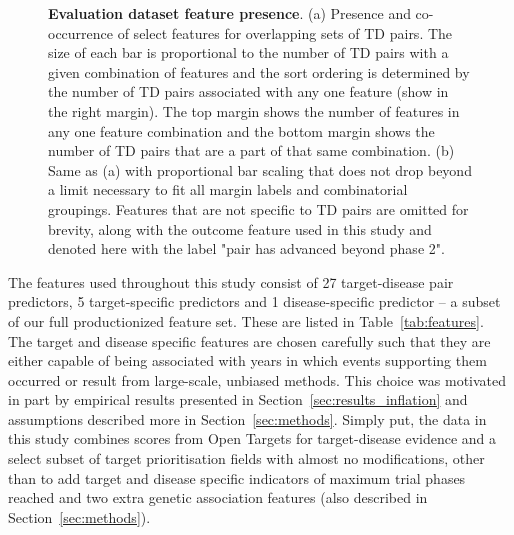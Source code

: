 \documentclass{article}
\begin{document}
\begin{figure}[!htb]
  \centering
  \captionsetup{width=.9\linewidth}
  \captionsetup[subfigure]{labelformat=empty}
  \qquad
  \caption{
    \textbf{Evaluation dataset feature presence}.
    (a) Presence and co-occurrence of select features for overlapping sets of TD pairs. The size of each bar is proportional to the number of TD pairs with a given combination of features and the sort ordering is determined by the number of TD pairs associated with any one feature (show in the right margin). The top margin shows the number of features in any one feature combination and the bottom margin shows the number of TD pairs that are a part of that same combination.
    (b) Same as (a) with proportional bar scaling that does not drop beyond a limit necessary to fit all margin labels and combinatorial groupings. Features that are not specific to TD pairs are omitted for brevity, along with the outcome feature used in this study and denoted here with the label "pair has advanced beyond phase 2".
  }
  \label{fig:feature_presence}
\end{figure}

The features used throughout this study consist of 27 target-disease pair predictors, 5 target-specific predictors and 1 disease-specific predictor -- a subset of our full productionized feature set. These are listed in Table~\ref{tab:features}. The target and disease specific features are chosen carefully such that they are either capable of being associated with years in which events supporting them occurred or result from large-scale, unbiased methods. This choice was motivated in part by empirical results presented in Section~\ref{sec:results_inflation} and assumptions described more in Section~\ref{sec:methods}. Simply put, the data in this study combines scores from Open Targets for target-disease evidence and a select subset of target prioritisation \cite{OTtargetPrioritisation} fields with almost no modifications, other than to add target and disease specific indicators of maximum trial phases reached and two extra genetic association features (also described in Section~\ref{sec:methods}).
\end{document}
